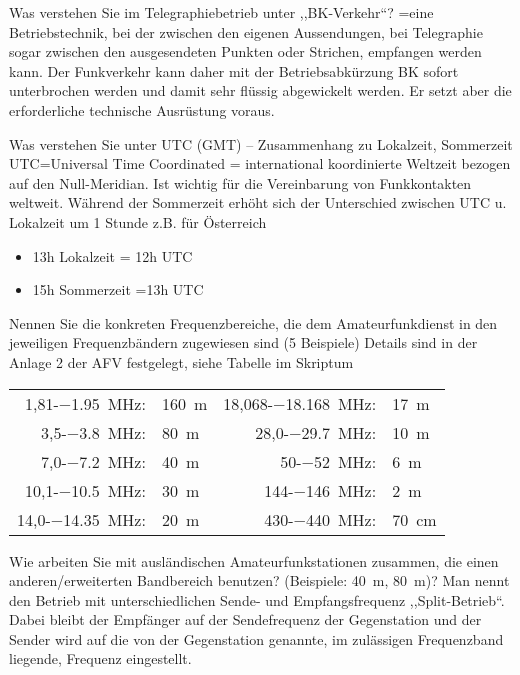 \documentclass[avery5371,grid,frame,a4paper]{flashcards}
\newcommand{\card}[3]{
  \begin{flashcard}[{\chap} -- #1]{#2}#3\end{flashcard}
}
\begin{document}
\card{38}{Was verstehen Sie im Telegraphiebetrieb unter ,,BK-Verkehr``?}{
  =eine Betriebstechnik, bei der zwischen den eigenen Aussendungen, bei Telegraphie sogar zwischen den ausgesendeten Punkten oder Strichen, empfangen werden kann. Der Funkverkehr kann daher mit der Betriebsabkürzung BK sofort unterbrochen werden und damit sehr flüssig abgewickelt werden. Er setzt aber die erforderliche technische Ausrüstung voraus.
}
\card{39}{Was verstehen Sie unter UTC (GMT) -- Zusammenhang zu Lokalzeit, Sommerzeit}{
  UTC=Universal Time Coordinated = international koordinierte Weltzeit bezogen auf den Null-Meridian. Ist wichtig für die Vereinbarung von Funkkontakten weltweit. Während der Sommerzeit erhöht sich der Unterschied zwischen UTC u. Lokalzeit um 1 Stunde  z.B. für Österreich
  \begin{itemize}
    \item 13h Lokalzeit = 12h UTC
    \item  15h Sommerzeit =13h UTC
  \end{itemize}
}
\card{40}{Nennen Sie die konkreten Frequenzbereiche, die dem Amateurfunkdienst in den jeweiligen Frequenzbändern zugewiesen sind (5 Beispiele)}{
  \small
  Details sind in der Anlage 2 der AFV festgelegt, siehe Tabelle im Skriptum

  \vspace{30pt}
  \footnotesize
  \begin{tabular}{rlrl}
    1,81-\SI{-1,95}{\mega\Hz}: & \SI{160}{\metre} & 18,068-\SI{-18,168}{\mega\Hz}: & \SI{17}{\metre} \\
    3,5-\SI{-3,8}{\mega\Hz}: & \SI{80}{\metre} & 28,0-\SI{-29,7}{\mega\Hz}: & \SI{10}{\metre} \\
    7,0-\SI{-7,2}{\mega\Hz}: & \SI{40}{\metre} & 50-\SI{-52}{\mega\Hz}: & 6~m \\
    10,1-\SI{-10,5}{\mega\Hz}: & \SI{30}{\metre} & 144-\SI{-146}{\mega\Hz}: & 2~m \\
    14,0-\SI{-14,35}{\mega\Hz}: & \SI{20}{\metre} & 430-\SI{-440}{\mega\Hz}: & \SI{70}{\centi\metre} \\
  \end{tabular}
}
\card{41}{Wie arbeiten Sie mit ausländischen Amateurfunkstationen zusammen, die einen anderen/erweiterten Bandbereich benutzen? (Beispiele: \SI{40}{\metre}, \SI{80}{\metre})?}{
  Man nennt den Betrieb mit unterschiedlichen Sende- und Empfangsfrequenz ,,Split-Betrieb``. Dabei bleibt der Empfänger auf der Sendefrequenz der Gegenstation und der Sender wird auf die von der Gegenstation genannte, im zulässigen Frequenzband liegende, Frequenz eingestellt.
}
\end{document}
